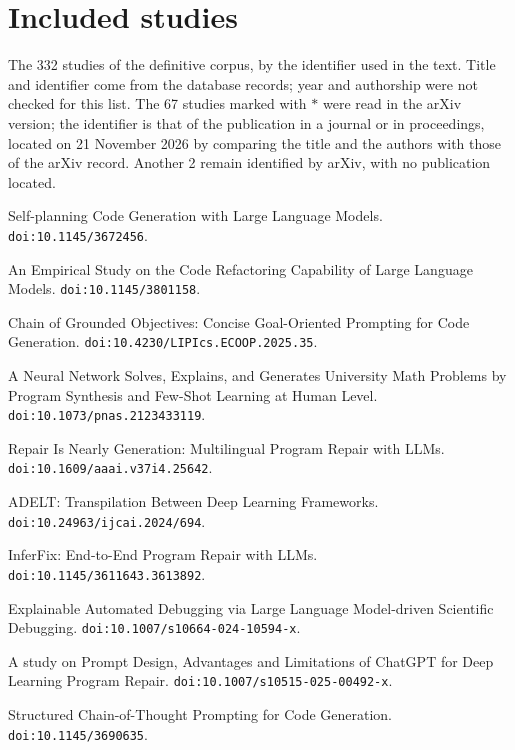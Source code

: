 \section{Included studies}\label{ap:estudos}
The 332 studies of the definitive corpus, by the identifier used in the text. Title and identifier come from the database records; year and authorship were not checked for this list. The 67 studies marked with $\ast$ were read in the arXiv version; the identifier is that of the publication in a journal or in proceedings, located on 21 November 2026 by comparing the title and the authors with those of the arXiv record. Another 2 remain identified by arXiv, with no publication located.

{\scriptsize\raggedright
\begin{description}\setlength{\itemsep}{0pt}\setlength{\parskip}{0pt}
\item[S1$^\ast$] Self-planning Code Generation with Large Language Models. \texttt{doi:10.1145/3672456}.
\item[S4$^\ast$] An Empirical Study on the Code Refactoring Capability of Large Language Models. \texttt{doi:10.1145/3801158}.
\item[S6] Chain of Grounded Objectives: Concise Goal-Oriented Prompting for Code Generation. \texttt{doi:10.4230/LIPIcs.ECOOP.2025.35}.
\item[S14] A Neural Network Solves, Explains, and Generates University Math Problems by Program Synthesis and Few-Shot Learning at Human Level. \texttt{doi:10.1073/pnas.2123433119}.
\item[S25$^\ast$] Repair Is Nearly Generation: Multilingual Program Repair with LLMs. \texttt{doi:10.1609/aaai.v37i4.25642}.
\item[S50$^\ast$] ADELT: Transpilation Between Deep Learning Frameworks. \texttt{doi:10.24963/ijcai.2024/694}.
\item[S53] InferFix: End-to-End Program Repair with LLMs. \texttt{doi:10.1145/3611643.3613892}.
\item[S62$^\ast$] Explainable Automated Debugging via Large Language Model-driven Scientific Debugging. \texttt{doi:10.1007/s10664-024-10594-x}.
\item[S65$^\ast$] A study on Prompt Design, Advantages and Limitations of ChatGPT for Deep Learning Program Repair. \texttt{doi:10.1007/s10515-025-00492-x}.
\item[S77] Structured Chain-of-Thought Prompting for Code Generation. \texttt{doi:10.1145/3690635}.

\end{description}}
